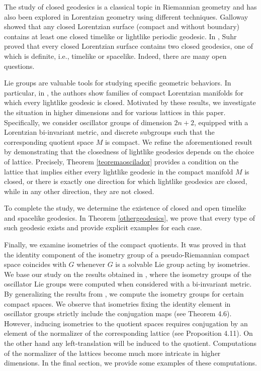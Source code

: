 \documentclass[12pt]{amsart}
\theoremstyle{plain}
\theoremstyle{definition}
\theoremstyle{remark}
\begin{document}
The study of closed geodesics is a classical topic in Riemannian geometry and has also been explored in Lorentzian geometry using different techniques. Galloway \cite{Ga} showed that any closed Lorentzian surface (compact and without boundary) contains at least one closed timelike or lightlike periodic geodesic. In \cite{Su}, Suhr proved that every closed Lorentzian surface contains two closed geodesics, one of which is definite, i.e., timelike or spacelike. Indeed, there are many open questions.

Lie groups are valuable tools for studying specific geometric behaviors. In particular, in \cite{BOV}, the authors show families of compact Lorentzian manifolds for which every lightlike geodesic is closed. Motivated by these results, we investigate the situation in higher dimensions and for various lattices in this paper. Specifically, we consider oscillator groups of dimension $2n+2$, equipped with a Lorentzian bi-invariant metric, and discrete subgroups such that the corresponding quotient space $M$ is compact. We refine the aforementioned result by demonstrating that the closedness of lightlike geodesics depends on the choice of lattice. Precisely, Theorem \ref{teoremaoscilador} provides a condition on the lattice that implies either every lightlike geodesic in the compact manifold $M$ is closed, or there is exactly one direction for which lightlike geodesics are closed, while in any other direction, they are not closed.

To complete the study, we determine the existence of closed and open timelike and spacelike geodesics. In Theorem \ref{othergeodesics}, we prove that every type of such geodesic exists and provide explicit examples for each case.

Finally, we examine isometries of the compact quotients. It was proved in \cite{BG} that the identity component of the isometry group of a pseudo-Riemannian compact space coincides with $G$ whenever $G$ is a solvable Lie group acting by isometries. We base our study on the results obtained in \cite{Bou}, where the isometry groups of the oscillator Lie groups were computed when considered with a bi-invariant metric. By generalizing the results from \cite{BOV}, we compute the isometry groups for certain compact spaces. We observe that isometries fixing the identity element in oscillator groups strictly include the conjugation maps (see Theorem 4.6). However, inducing isometries to the quotient spaces requires conjugation by an element of the normalizer of the corresponding lattice (see Proposition 4.11). On the other hand any left-translation will be induced to the quotient. Computations of the normalizer of the lattices become much more intricate in higher dimensions. In the final section, we provide some examples of these computations.
\end{document}
